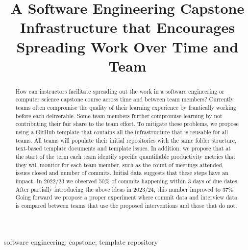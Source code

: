 \documentclass[10pt, conference]{IEEEtran}
\begin{document}
\title{A Software Engineering Capstone Infrastructure that Encourages Spreading
Work Over Time and Team}

\author{
}

\maketitle
  
\begin{abstract}

How can instructors facilitate spreading out the work in a software engineering
or computer science capstone course across time and between team members?
Currently teams often compromise the quality of their learning experience by
frantically working before each deliverable.  Some team members further
compromise learning by not contributing their fair share to the team effort. To
mitigate these problems, we propose using a GitHub template that contains all
the infrastructure that is reusable for all teams.  All teams will populate
their initial repositories with the same folder structure, text-based template
documents and template issues. In addition, we propose that at the start of the
term each team identify specific quantifiable productivity metrics that they
will monitor for each team member, such as the count of meetings attended,
issues closed and number of commits.  Initial data suggests that these steps
have an impact.  In 2022/23 we observed 50\% of commits happening within 3 days
of due dates.  After partially introducing the above ideas in 2023/24, this number
improved to 37\%. Going forward we propose a proper experiment where commit data
and interview data is compared between teams that use the proposed interventions
and those that do not.

\end{abstract}

\begin{IEEEkeywords}
software engineering; capstone; template repository
\end{IEEEkeywords}
\end{document}
